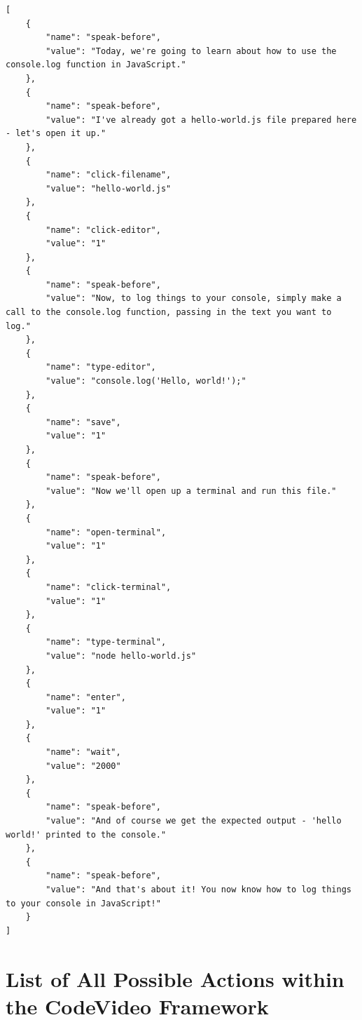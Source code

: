\documentclass[11pt, a4paper]{article}
\begin{document}
\begin{appendices}
\begin{Verbatim}[breaklines=true]
[
    {
        "name": "speak-before",
        "value": "Today, we're going to learn about how to use the console.log function in JavaScript."
    },
    {
        "name": "speak-before",
        "value": "I've already got a hello-world.js file prepared here - let's open it up."
    },
    {
        "name": "click-filename",
        "value": "hello-world.js"
    },
    {
        "name": "click-editor",
        "value": "1"
    },
    {
        "name": "speak-before",
        "value": "Now, to log things to your console, simply make a call to the console.log function, passing in the text you want to log."
    },
    {
        "name": "type-editor",
        "value": "console.log('Hello, world!');"
    },
    {
        "name": "save",
        "value": "1"
    },
    {
        "name": "speak-before",
        "value": "Now we'll open up a terminal and run this file."
    },
    {
        "name": "open-terminal",
        "value": "1"
    },
    {
        "name": "click-terminal",
        "value": "1"
    },
    {
        "name": "type-terminal",
        "value": "node hello-world.js"
    },
    {
        "name": "enter",
        "value": "1"
    },
    {
        "name": "wait",
        "value": "2000"
    },
    {
        "name": "speak-before",
        "value": "And of course we get the expected output - 'hello world!' printed to the console."
    },
    {
        "name": "speak-before",
        "value": "And that's about it! You now know how to log things to your console in JavaScript!"
    }
]
\end{Verbatim}

\section{List of All Possible Actions within the CodeVideo Framework}
\label{app:actions}


\end{appendices}
\end{document}
